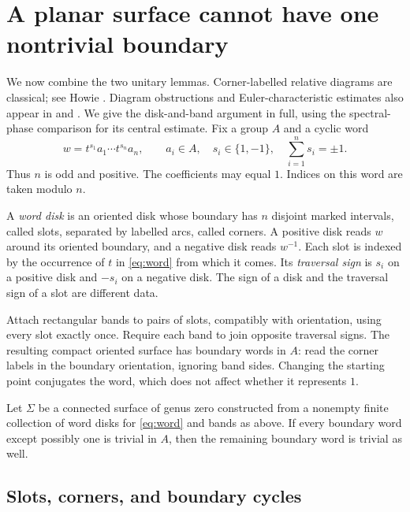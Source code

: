 \section{A planar surface cannot have one nontrivial boundary}
\label{sec:diagram}

We now combine the two unitary lemmas. Corner-labelled relative diagrams
are classical; see Howie \cite[Section 1, Lemma 1]{Howie1983}.
Diagram obstructions and Euler-characteristic estimates also appear in
\cite[preprint Sections 3--4, especially Lemma 2]{KlyachkoLurye2012} and
\cite[preprint Sections 3--4]{Chen2026}. We give the disk-and-band argument in full,
using the spectral-phase comparison for its central estimate.
Fix a group $A$ and a cyclic word
\begin{equation}\label{eq:word}
 w=t^{s_1}a_1\cdots t^{s_n}a_n,
 \qquad a_i\in A,\quad s_i\in\{1,-1\},\quad
 \sum_{i=1}^n s_i=\pm1.
\end{equation}
Thus $n$ is odd and positive. The coefficients may equal $1$.
Indices on this word are taken modulo $n$.

A \emph{word disk} is an oriented disk whose boundary has $n$ disjoint
marked intervals, called slots, separated by labelled arcs, called corners.
A positive disk reads $w$ around its oriented boundary, and a negative disk
reads $w^{-1}$. Each slot is indexed by the occurrence of $t$ in
\eqref{eq:word} from which it comes. Its \emph{traversal sign} is $s_i$ on
a positive disk and $-s_i$ on a negative disk. The sign of a disk and the
traversal sign of a slot are different data.

Attach rectangular bands to pairs of slots, compatibly with orientation,
using every slot exactly once. Require each band to join opposite traversal
signs. The resulting compact oriented surface has boundary words in $A$:
read the corner labels in the boundary orientation, ignoring band sides.
Changing the starting point conjugates the word, which does not affect
whether it represents $1$.

\begin{theorem}\label{thm:planar}
Let $\Sigma$ be a connected surface of genus zero constructed from a
nonempty finite collection of word disks for \eqref{eq:word} and bands as
above. If every boundary word except possibly one is trivial in $A$, then
the remaining boundary word is trivial as well.
\end{theorem}

\subsection{Slots, corners, and boundary cycles}

